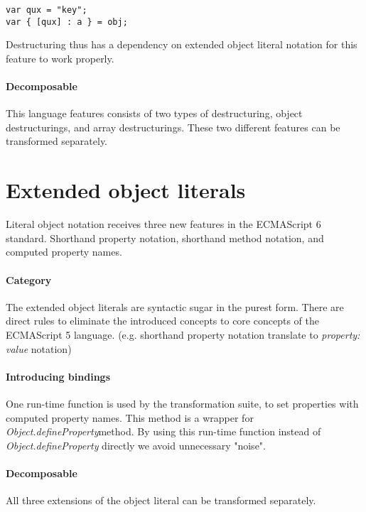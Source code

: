 \begin{lstlisting}
var qux = "key";
var { [qux] : a } = obj;
\end{lstlisting}

Destructuring thus has a dependency on extended object literal notation for this feature to work properly.

\paragraph{Decomposable}
This language features consists of two types of destructuring, object destructurings, and array destructurings. These two different features can be transformed separately.

\section{Extended object literals} \label{object-literals}
Literal object notation receives three new features in the ECMAScript 6 standard\cite[12.2.5]{SpecJS}. Shorthand property notation, shorthand method notation, and computed property names.

\paragraph{Category}
The extended object literals are syntactic sugar in the purest form. There are direct rules to eliminate the introduced concepts to core concepts of the ECMAScript 5 language. (e.g. shorthand property notation translate to \textit{property: value} notation)

\paragraph{Introducing bindings}
One run-time function is used by the transformation suite, to set properties with computed property names. This method is a wrapper for \textit{Object.defineProperty}\footnotemark method. By using this run-time function instead of \textit{Object.defineProperty} directly we avoid unnecessary "noise".

\paragraph{Decomposable}
All three extensions of the object literal can be transformed separately.

